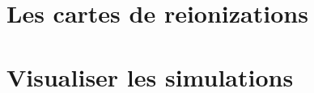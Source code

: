 \documentclass[ twoside,openright,titlepage,numbers=noenddot,headinclude,%
                footinclude=true,cleardoublepage=empty,abstractoff, %
                BCOR=5mm,paper=a4,fontsize=11pt,%
                frenchb,english,%
                ]{scrreprt}
\begin{document}




\part{Les cartes de reionizations}


\part{Visualiser les  simulations}



\appendix


\cleardoublepage
\cleardoublepage
\cleardoublepage

 
\end{document}
